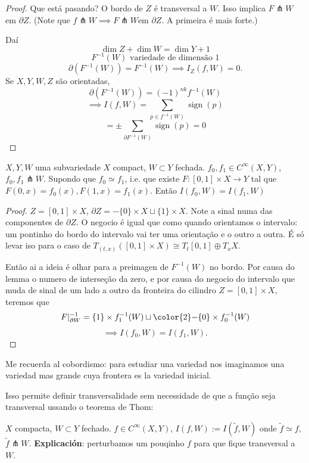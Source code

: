 \begin{proof}\leavevmode
Que está pasando? O bordo de \(Z\) é transversal a \(W\). Isso implica  \(F \pitchfork W\) em \(\partial Z\). (Note que \(f \pitchfork  W \implies F \pitchfork  W\)em \(\partial Z\). A primeira é mais forte.)

Daí
\[\dim Z+ \dim W= \dim Y+1\]
\[F^{-1}(W) \text{ variedade de dimensão 1} \]
\[\partial (F^{-1}(W))= F^{-1}(W) \implies I_Z(f,W)=0. \]
Se \(X,Y,W,Z\) são orientadas,
\[\partial (F^{-1}(W))= (-1)^{nk}f^{-1}(W)\]
\[\implies I(f,W) = \sum_{p \in f^{-1}(W)}\operatorname{sign}(p)\]
\[= \pm  \sum_{ \partial  F^{-1}(W)}\operatorname{ sign}(p)=0\]
\end{proof}

\begin{thm}\leavevmode
	\(X,Y,W\) uma subvariedade \(X \) compact, \(W \subset Y\) fechada. \(f_0,f_1 \in C^\infty(X,Y)\), \(f_0,f_1\pitchfork W\). Supondo que \(f_0 \simeq f_1\), i.e. que existe \(F:[0,1] \times X \to Y\) tal que \(F(0,x)=f_0(x), F(1,x)=f_1(x)\). Então \(I(f_0,W)=I(f_1,W)\)
\end{thm}

\begin{proof}\leavevmode
	\(Z=[0,1] \times X\), \(\partial Z=-\{0\}\times X \sqcup \{ 1\}\times X\). Note a sinal numa das componentes de \(\partial Z\). O negocio é igual que como quando orientamos o intervalo: um pontinho do bordo do intervalo vai ter uma orientação e o outro a outra. É só levar iso para o caso de \(T_{(t,x)}([0,1] \times X) \cong T_t[0,1] \oplus  T_xX\).

	Então ai a ideia é olhar para a preimagen de \(F^{-1}(W)\) no bordo. Por causa do lemma o numero de interseção da zero, e por causa do negocio do intervalo que muda de sinal de um lado a outro da fronteira do cilindro \(Z=[0,1] \times X\), teremos que
	\[F|_{\partial W}^{-1}=\{1\}\times f^{-1}_1(W) \sqcup {\color{2}-}\{0\} \times f^{-1}_0(W)\]
	\[\implies I(f_0,W) = I(f_1,W).\]
\end{proof}

\begin{remark}[dani]\leavevmode
	Me recuerda al cobordismo: para estudiar una variedad nos imaginamos una variedad mas grande cuya frontera es la variedad inicial.
\end{remark}

Isso permite definir transversalidade sem necessidade de que a função seja transversal ussando o teorema de Thom:

\(X\) compacta, \(W \subset Y\) fechado. \(f \in C^\infty (X,Y)\), \(I(f,W):= I(\tilde{f},W)\) onde \(\tilde{f} \simeq f\), \(\tilde{f} \pitchfork  W\). \textbf{Explicación}: perturbamos um pouqinho \(f\) para que fique transversal a \(W\).


